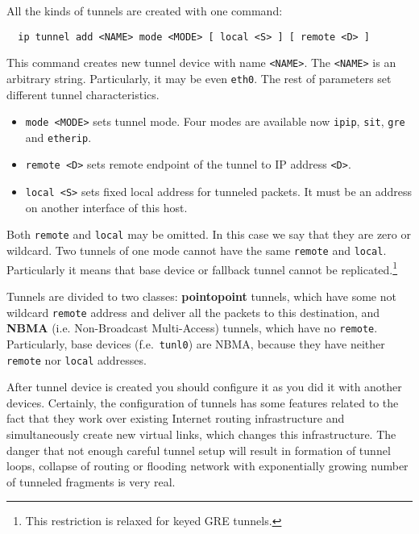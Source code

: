 \vspace{2mm}

\noindent All the kinds of tunnels are created with one command:
\begin{verbatim}
  ip tunnel add <NAME> mode <MODE> [ local <S> ] [ remote <D> ]
\end{verbatim}

This command creates new tunnel device with name \verb|<NAME>|.
The \verb|<NAME>| is an arbitrary string. Particularly,
it may be even \verb|eth0|. The rest of parameters set
different tunnel characteristics.

\begin{itemize}

\item
\verb|mode <MODE>| sets tunnel mode. Four modes are available now
	\verb|ipip|, \verb|sit|, \verb|gre| and \verb|etherip|.

\item
\verb|remote <D>| sets remote endpoint of the tunnel to IP
	address \verb|<D>|.
\item
\verb|local <S>| sets fixed local address for tunneled
	packets. It must be an address on another interface of this host.

\end{itemize}

\let\thefootnote\oldthefootnote

Both \verb|remote| and \verb|local| may be omitted. In this case we
say that they are zero or wildcard. Two tunnels of one mode cannot
have the same \verb|remote| and \verb|local|. Particularly it means
that base device or fallback tunnel cannot be replicated.\footnote{
This restriction is relaxed for keyed GRE tunnels.}

Tunnels are divided to two classes: {\bf pointopoint} tunnels, which
have some not wildcard \verb|remote| address and deliver all the packets
to this destination, and {\bf NBMA} (i.e. Non-Broadcast Multi-Access) tunnels,
which have no \verb|remote|. Particularly, base devices (f.e.\ \verb|tunl0|)
are NBMA, because they have neither \verb|remote| nor
\verb|local| addresses.


After tunnel device is created you should configure it as you did
it with another devices. Certainly, the configuration of tunnels has
some features related to the fact that they work over existing Internet
routing infrastructure and simultaneously create new virtual links,
which changes this infrastructure. The danger that not enough careful
tunnel setup will result in formation of tunnel loops,
collapse of routing or flooding network with exponentially
growing number of tunneled fragments is very real.


